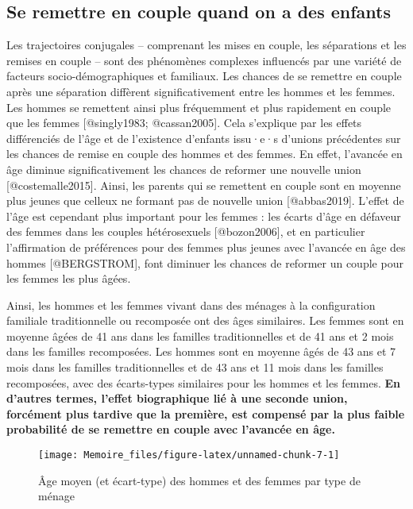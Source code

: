 \documentclass[
  12pt,
]{book}
\begin{document}
\subsection{Se remettre en couple quand on a des
enfants}\label{se-remettre-en-couple-quand-on-a-des-enfants}

Les trajectoires conjugales -- comprenant les mises en couple, les
séparations et les remises en couple -- sont des phénomènes complexes
influencés par une variété de facteurs socio-démographiques et
familiaux. Les chances de se remettre en couple après une séparation
diffèrent significativement entre les hommes et les femmes. Les hommes
se remettent ainsi plus fréquemment et plus rapidement en couple que les
femmes {[}@singly1983; @cassan2005{]}. Cela s'explique par les effets
différenciés de l'âge et de l'existence d'enfants issu·e·s d'unions
précédentes sur les chances de remise en couple des hommes et des
femmes. En effet, l'avancée en âge diminue significativement les chances
de reformer une nouvelle union {[}@costemalle2015{]}. Ainsi, les parents
qui se remettent en couple sont en moyenne plus jeunes que celleux ne
formant pas de nouvelle union {[}@abbas2019{]}. L'effet de l'âge est
cependant plus important pour les femmes : les écarts d'âge en défaveur
des femmes dans les couples hétérosexuels {[}@bozon2006{]}, et en
particulier l'affirmation de préférences pour des femmes plus jeunes
avec l'avancée en âge des hommes {[}@BERGSTROM{]}, font diminuer les
chances de reformer un couple pour les femmes les plus âgées.

Ainsi, les hommes et les femmes vivant dans des ménages à la
configuration familiale traditionnelle ou recomposée ont des âges
similaires. Les femmes sont en moyenne âgées de 41 ans dans les familles
traditionnelles et de 41 ans et 2 mois dans les familles recomposées.
Les hommes sont en moyenne âgés de 43 ans et 7 mois dans les familles
traditionnelles et de 43 ans et 11 mois dans les familles recomposées,
avec des écarts-types similaires pour les hommes et les femmes.
\textbf{En d'autres termes, l'effet biographique lié à une seconde
union, forcément plus tardive que la première, est compensé par la plus
faible probabilité de se remettre en couple avec l'avancée en âge.}

\begin{figure}[h]

{\centering \texttt{[image: Memoire\_files/figure-latex/unnamed-chunk-7-1]} 

}

\caption{Âge moyen (et écart-type) des hommes et des femmes par type de ménage}\label{fig:unnamed-chunk-7}
\end{figure}
\end{document}
